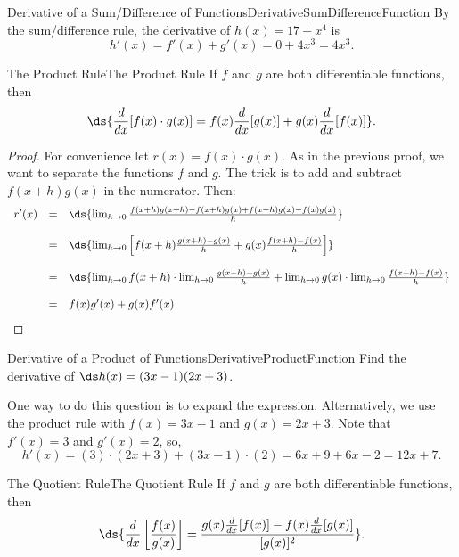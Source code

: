 \begin{example}{Derivative of a Sum/Difference of Functions}{DerivativeSumDifferenceFunction}
By the sum/difference rule, the derivative of $h(x)=17+x^4$ is 
$$h'(x)=f'(x)+g'(x)=0+4x^3=4x^3.$$
\end{example}

\begin{theorem}{The Product Rule}{The Product Rule}
If $f$ and $g$ are both differentiable functions, then
$$\ds{\frac{d}{dx}[f(x)\cdot g(x)]=f(x)\frac{d}{dx}[g(x)]+g(x)\frac{d}{dx}[f(x)]}.$$
\end{theorem}

\begin{proof}
For convenience let $r(x)=f(x)\cdot g(x)$.
As in the previous proof, we want to separate the functions $f$ and $g$.
The trick is to add and subtract $f(x+h)g(x)$ in the numerator.
Then:
$$\begin{array}{ccl}
r'(x)&=&\ds{\lim_{h\to 0}\frac{f(x+h)g(x+h)-f(x+h)g(x)+f(x+h)g(x)-f(x)g(x)}{h}}\\
\\
~&=&\ds{\lim_{h\to 0}\left[f(x+h)\frac{g(x+h)-g(x)}{h}+g(x)\frac{f(x+h)-f(x)}{h}\right]}\\
\\
~&=&\ds{\lim_{h\to 0}f(x+h)\cdot\lim_{h\to 0}\frac{g(x+h)-g(x)}{h}+\lim_{h\to 0}g(x)\cdot\lim_{h\to 0}\frac{f(x+h)-f(x)}{h}}\\
\\
~&=&f(x)g'(x)+g(x)f'(x)\\\end{array}$$
\end{proof}

\begin{example}{Derivative of a Product of Functions}{DerivativeProductFunction}
Find the derivative of $\ds h(x)=(3x-1)(2x+3)$.
\end{example}

\begin{solution} 
One way to do this question is to expand the expression.
Alternatively, we use the product rule with $f(x)=3x-1$ and $g(x)=2x+3$.
Note that $f'(x)=3$ and $g'(x)=2$, so,
$$h'(x)=(3)\cdot(2x+3)+(3x-1)\cdot(2)=6x+9+6x-2=12x+7.$$
\end{solution}

\begin{theorem}{The Quotient Rule}{The Quotient Rule}
If $f$ and $g$ are both differentiable functions, then $$\ds{\frac{d}{dx}\left[\frac{f(x)}{g(x)}\right]
=\frac{g(x)\frac{d}{dx}[f(x)]-f(x)\frac{d}{dx}[g(x)]}{[g(x)]^2}}.$$
\end{theorem}

